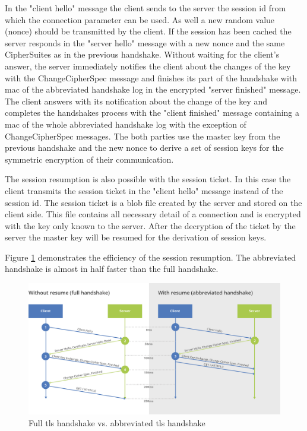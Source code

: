 In the "client hello" message the client sends to the server the session id from which the connection parameter can be used. As well a new random value (nonce) should be transmitted by the client. If the session has been cached the server responds in the "server hello" message with a new nonce and the same CipherSuites as in the previous handshake. Without waiting for the client's answer, the server immediately notifies the client about the changes of the key with the ChangeCipherSpec message and finishes its part of the handshake with \gls{mac} of the abbreviated handshake log in the encrypted "server finished" message. The client answers with its notification about the change of the key and completes the handshakes process with the "client finished" message containing a \gls{mac} of the whole abbreviated handshake log with the exception of ChangeCipherSpec messages. The both parties use the master key from the previous handshake and the new nonce to derive a set of session keys for the symmetric encryption of their communication.

The session resumption is also possible with the session ticket. In this case the client transmits the session ticket in the "client hello" message instead of the session id. The session ticket is a blob file created by the server and stored on the client side. This file contains all necessary detail of a connection and is encrypted with the key only known to the server. After the decryption of the ticket by the server the master key will be resumed for the derivation of session keys.

Figure \ref{fig:without-with-resume-1_2} demonstrates the efficiency of the session resumption. The abbreviated handshake is almost in half faster than the full handshake.

\begin{figure}[H]
	\centering
		\includegraphics[scale=0.4]{images/without-with-resume-1_2.png}
	\caption{Full \gls{tls} handshake vs. abbreviated \gls{tls} handshake \cite{cloudflare:resume}}
	\label{fig:without-with-resume-1_2}
\end{figure}

